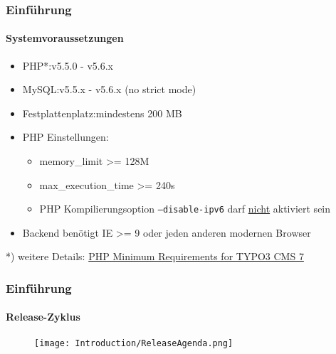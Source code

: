 \begin{frame}[fragile]
	\frametitle{Einführung}
	\framesubtitle{Systemvoraussetzungen}

	\begin{itemize}
		\item PHP*:\tabto{3cm}v5.5.0 - v5.6.x
		\item MySQL:\tabto{3cm}v5.5.x - v5.6.x (no strict mode)
		\item Festplattenplatz:\tabto{3cm}mindestens 200 MB
		\item PHP Einstellungen:

			\begin{itemize}
				\item memory\_limit >= 128M
				\item max\_execution\_time >= 240s
				\item PHP Kompilierungsoption \texttt{--disable-ipv6} darf \underline{nicht} aktiviert sein
			\end{itemize}

		\item Backend benötigt IE >= 9 oder jeden anderen modernen Browser

	\end{itemize}

	\vspace{1cm}

	*) weitere Details: \href{http://typo3.org/news/article/php-minimum-requirements-for-typo3-cms-7/}{PHP Minimum Requirements for TYPO3 CMS 7}

\end{frame}

\begin{frame}[fragile]
	\frametitle{Einführung}
	\framesubtitle{Release-Zyklus}

	\begin{figure}
		\texttt{[image: Introduction/ReleaseAgenda.png]}
	\end{figure}

\end{frame}

